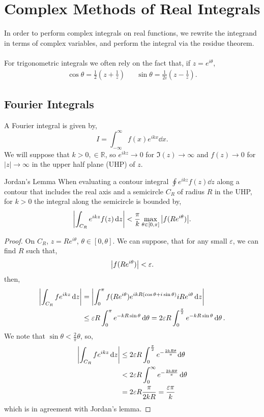 \documentclass{book}
\begin{document}
\section{Complex Methods of Real Integrals}
In order to perform complex integrals on real functions, we rewrite the integrand in terms of complex variables, and perform the integral via the residue theorem.
\\\\
For trigonometric integrals we often rely on the fact that, if $z = e^{i\theta}$,
\begin{align}
	\cos\theta = \frac{1}{2}\left(z + \frac{1}{z}\right) && \sin\theta = \frac{1}{2i}\left(z - \frac{1}{z}\right).
\end{align} 
\subsection{Fourier Integrals}
A Fourier integral is given by,
\begin{equation}
	I = \int_{-\infty}^{\infty}f(x)e^{ikx}\dd{x}.
\end{equation}
We will suppose that $k > 0, \in \mathbb{R}$, so $e^{ikz} \to 0$ for $\Im(z) \to \infty$ and $f(z) \to 0$ for $|z| \to \infty$ in the upper half plane (UHP) of $z$.
\begin{Lemma}{Jordan's Lemma}{}
	When evaluating a contour integral $\oint e^{ikz}f(z) \dd{z}$ along a contour that includes the real axis and a semicircle $C_R$ of radius $R$ in the UHP, for $k >0$ the integral along the semicircle is bounded by,
	\begin{equation}
		\abs{\int_{C_R} e^{ikz}f(z)\dd{z}} < \frac{\pi}{k}\max_{\theta \in \left[0,\pi\right]}\abs{f(Re^{i\theta})}.
	\end{equation}
\end{Lemma}
\begin{proof}
	On $C_R$, $z=Re^{i\theta}$, $\theta \in \left[0,\theta\right]$. We can suppose, that for any small $\varepsilon$, we can find $R$ such that,
	\begin{equation}
		\abs{f(Re^{i\theta})} < \varepsilon.
	\end{equation}
	then,
	\begin{align}
		\abs{\int_{C_R}fe^{ikz}\dd{z}} & = \abs{\int_0^{\pi} f(Re^{i\theta})e^{ikR(\cos\theta + i \sin\theta)}iRe^{i\theta}\dd{z}} \\
		& \leq \varepsilon R\int_0^{\pi}e^{-kR\sin\theta}\dd{\theta} = 2\varepsilon R\int_0^{\frac{\pi}{2}}e^{-kR\sin\theta}\dd{\theta}.
	\end{align}
	We note that $\sin\theta < \frac{2}{\pi}\theta$, so,
	\begin{align}
			\abs{\int_{C_R}fe^{ikz}\dd{z}} & \leq 2\varepsilon R \int_0^{\frac{\pi}{2}}e^{-\frac{2kR\theta}{\pi}}\dd\theta \\
			&< 2\varepsilon R\int_0^{\infty}e^{-\frac{2kR\theta}{\pi}}\dd{\theta} \\
			&= 2\varepsilon R \frac{\pi}{2kR} = \frac{\varepsilon \pi}{k}
	\end{align}
	which is in agreement with Jordan's lemma. 
\end{proof}
\end{document}
